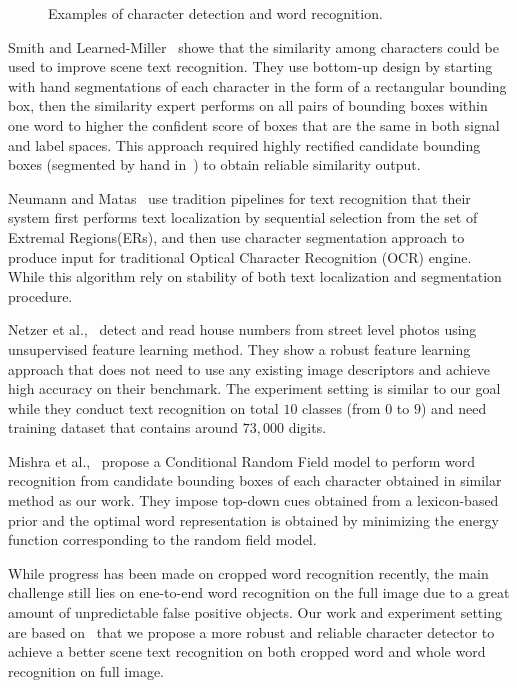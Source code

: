 \documentclass[10pt,twocolumn,letterpaper]{article}
\begin{document}
\begin{figure}[t]
\begin{center}
\end{center}
   \caption{Examples of character detection and word recognition.}
\label{fig:sample1}
\end{figure}

Smith and Learned-Miller~\cite{118} showe that the similarity among characters could be used to improve scene text recognition. They use bottom-up design by starting with hand segmentations of each character in the form of a rectangular bounding box, then the similarity expert performs on all pairs of bounding boxes within one word to higher the confident score of boxes that are the same in both signal and label spaces. This approach required highly rectified candidate bounding boxes (segmented by hand in~\cite{118}) to obtain reliable similarity output.

Neumann and Matas~\cite{120,119} use tradition pipelines for text recognition that their system first performs text localization by sequential selection from the set of Extremal Regions(ERs), and then use character segmentation approach to produce input for traditional Optical Character Recognition (OCR) engine. While this algorithm rely on stability of both text localization and segmentation procedure.

Netzer et al.,~\cite{121} detect and read house numbers from street level photos using unsupervised feature learning method. They show a robust feature learning approach that does not need to use any existing image descriptors and achieve high accuracy on their benchmark. The experiment setting is similar to our goal while they conduct text recognition on total $10$ classes (from $0$ to $9$) and need training dataset that contains around $73,000$ digits.

Mishra et al.,~\cite{111} propose a Conditional Random Field model to perform word recognition from candidate bounding boxes of each character obtained in similar method as our work. They impose top-down cues obtained from a lexicon-based prior and the optimal word representation is obtained by minimizing the energy function corresponding to the random field model.

While progress has been made on cropped word recognition recently, the main challenge still lies on ene-to-end word recognition on the full image due to a great amount of unpredictable false positive objects. Our work and experiment setting are based on~\cite{417} that we propose a more robust and reliable character detector to achieve a better scene text recognition on both cropped word and whole word recognition on full image.
\end{document}
